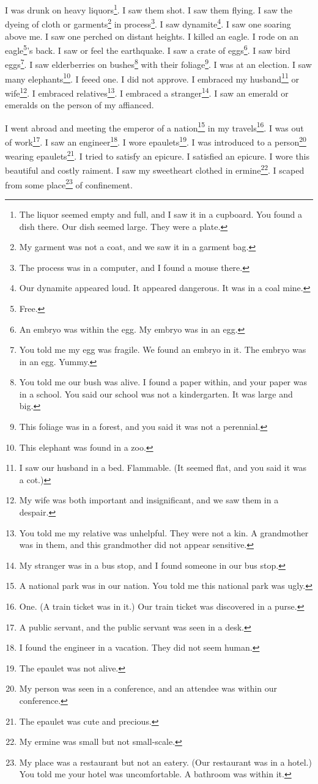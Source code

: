 \documentclass[12pt]{book}
\begin{document}
 I was drunk on heavy liquors\footnote{The liquor seemed empty and full, and I saw it in a cupboard. You found a dish there. Our dish seemed large. They were a plate.}. I saw them shot. I saw them flying. I saw the dyeing of cloth or garments\footnote{My garment was not a coat, and we saw it in a garment bag.} in process\footnote{The process was in a computer, and I found a mouse there.}. I saw dynamite\footnote{Our dynamite appeared loud. It appeared dangerous. It was in a coal mine.}. I saw one soaring above me. I saw one perched on distant heights. I killed an eagle. I rode on an eagle\footnote{Free.}'s back. I saw or feel the earthquake. I saw a crate of eggs\footnote{An embryo was within the egg. My embryo was in an egg.}. I saw bird eggs\footnote{You told me my egg was fragile. We found an embryo in it. The embryo was in an egg. Yummy.}. I saw elderberries on bushes\footnote{You told me our bush was alive. I found a paper within, and your paper was in a school. You said our school was not a kindergarten. It was large and big.} with their foliage\footnote{This foliage was in a forest, and you said it was not a perennial.}. I was at an election. I saw many elephants\footnote{This elephant was found in a zoo.}. I feeed one. I did not approve. I embraced my husband\footnote{I saw our husband in a bed. Flammable. (It seemed flat, and you said it was a cot.)} or wife\footnote{My wife was both important and insignificant, and we saw them in a despair.}. I embraced relatives\footnote{You told me my relative was unhelpful. They were not a kin. A grandmother was in them, and this grandmother did not appear sensitive.}. I embraced a stranger\footnote{My stranger was in a bus stop, and I found someone in our bus stop.}. I saw an emerald or emeralds on the person of my affianced. 

 I went abroad and meeting the emperor of a nation\footnote{A national park was in our nation. You told me this national park was ugly.} in my travels\footnote{One. (A train ticket was in it.) Our train ticket was discovered in a purse.}. I was out of work\footnote{A public servant, and the public servant was seen in a desk.}. I saw an engineer\footnote{I found the engineer in a vacation. They did not seem human.}. I wore epaulets\footnote{The epaulet was not alive.}. I was introduced to a person\footnote{My person was seen in a conference, and an attendee was within our conference.} wearing epaulets\footnote{The epaulet was cute and precious.}. I tried to satisfy an epicure. I satisfied an epicure. I wore this beautiful and costly raiment. I saw my sweetheart clothed in ermine\footnote{My ermine was small but not small-scale.}. I scaped from some place\footnote{My place was a restaurant but not an eatery. (Our restaurant was in a hotel.) You told me your hotel was uncomfortable. A bathroom was within it.} of confinement. 
\end{document}

